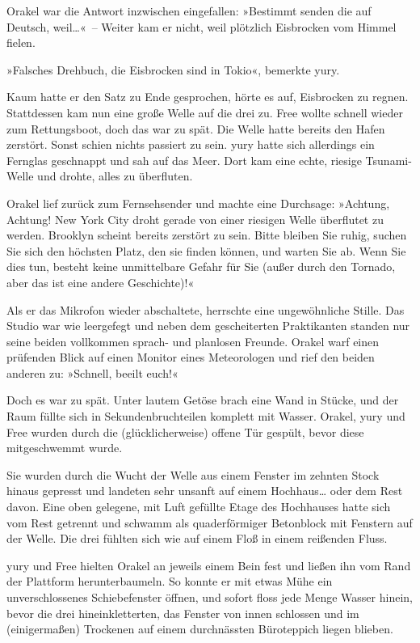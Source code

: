 Orakel war die Antwort inzwischen eingefallen: »Bestimmt senden die auf Deutsch, weil…«~– Weiter kam er nicht, weil plötzlich Eisbrocken vom Himmel fielen.

»Falsches Drehbuch, die Eisbrocken sind in Tokio«, bemerkte yury.

Kaum hatte er den Satz zu Ende gesprochen, hörte es auf, Eisbrocken zu regnen. Stattdessen kam nun eine große Welle auf die drei zu. Free wollte schnell wieder zum Rettungsboot, doch das war zu spät. Die Welle hatte bereits den Hafen zerstört. Sonst schien nichts passiert zu sein. yury hatte sich allerdings ein Fernglas geschnappt und sah auf das Meer. Dort kam eine echte, riesige Tsunami-Welle und drohte, alles zu überfluten.

Orakel lief zurück zum Fernsehsender und machte eine Durchsage: »Achtung, Achtung! New York City droht gerade von einer riesigen Welle überflutet zu werden. Brooklyn scheint bereits zerstört zu sein. Bitte bleiben Sie ruhig, suchen Sie sich den höchsten Platz, den sie finden können, und warten Sie ab. Wenn Sie dies tun, besteht keine unmittelbare Gefahr für Sie (außer durch den Tornado, aber das ist eine andere Geschichte)!«

Als er das Mikrofon wieder abschaltete, herrschte eine ungewöhnliche Stille. Das Studio war wie leergefegt und neben dem gescheiterten Praktikanten standen nur seine beiden vollkommen sprach- und planlosen Freunde. Orakel warf einen prüfenden Blick auf einen Monitor eines Meteorologen und rief den beiden anderen zu: »Schnell, beeilt euch!«

Doch es war zu spät. Unter lautem Getöse brach eine Wand in Stücke, und der Raum füllte sich in Sekundenbruchteilen komplett mit Wasser. Orakel, yury und Free wurden durch die (glücklicherweise) offene Tür gespült, bevor diese mitgeschwemmt wurde.

Sie wurden durch die Wucht der Welle aus einem Fenster im zehnten Stock hinaus gepresst und landeten sehr unsanft auf einem Hochhaus… oder dem Rest davon. Eine oben gelegene, mit Luft gefüllte Etage des Hochhauses hatte sich vom Rest getrennt und schwamm als quaderförmiger Betonblock mit Fenstern auf der Welle. Die drei fühlten sich wie auf einem Floß in einem reißenden Fluss.

yury und Free hielten Orakel an jeweils einem Bein fest und ließen ihn vom Rand der Plattform herunterbaumeln. So konnte er mit etwas Mühe ein unverschlossenes Schiebefenster öffnen, und sofort floss jede Menge Wasser hinein, bevor die drei hineinkletterten, das Fenster von innen schlossen und im (einigermaßen) Trockenen auf einem durchnässten Büroteppich liegen blieben.

